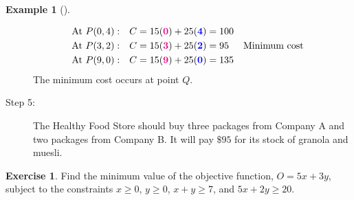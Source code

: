 \documentclass[10pt,]{book}
\theoremstyle{plain}
\theoremstyle{definition}
\theoremstyle{definition}
\newtheorem{example}[theorem]{Example}
\theoremstyle{definition}
\newtheorem{exercise}[theorem]{Exercise}
\numberwithin{equation}{part}
\newcommand{\alert}[1]{\boldsymbol{\color{magenta}{#1}}}
\newcommand{\blert}[1]{\boldsymbol{\color{blue}{#1}}}
\newcommand{\amp}{&}
\begin{document}
\begin{example}[]
\begin{description}
\begin{align*}
\amp\text{At }P (0, 4): \amp C \amp= 15(\alert{0})+ 25(\blert{4}) = 100{}
\\
\amp\text{At }P (3,2):\amp C \amp= 15(\alert{3})+ 25(\blert{2}) = 95{}\amp\amp\text{Minimum cost}
\\
\amp\text{At }P (9,0): \amp C \amp= 15(\alert{9})+ 25(\blert{0}) = 135{}\amp
\end{align*}
The minimum cost occurs at point \(Q\).%
\item[{Step 5:}]\hypertarget{li-38}{}The Healthy Food Store should buy three packages from Company A and two packages from Company B. It will pay \(\$95\) for its stock of granola and muesli.%
\end{description}
%
\end{example}
\begin{exercise}\label{exercise-4}
Find the minimum value of the objective function, \(O = 5x + 3y\), subject to the constraints \(x\ge 0\), \(y\ge 0\), \(x + y \ge 7\), and \(5x + 2y \ge 20\).%
\end{exercise}
\end{document}

